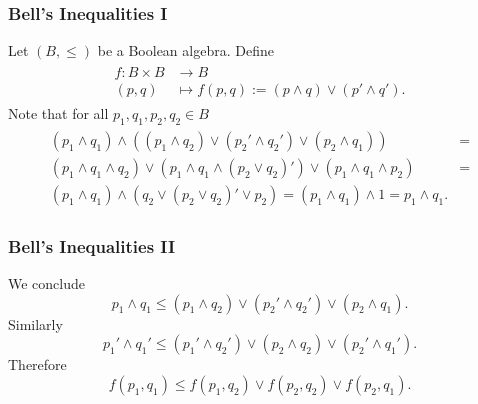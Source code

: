 \documentclass{beamer}
\begin{document}
\begin{frame}

	\frametitle{Bell's Inequalities I}
	
	Let $(B,\leq)$ be a Boolean algebra. Define
	\begin{align}
	\begin{split}
		f:B\times B&\rightarrow B\\
		(p,q)&\mapsto f(p,q):=(p\wedge q)\vee(p'\wedge q').
	\end{split}
	\end{align}
	Note that for all $p_1,q_1,p_2,q_2\in B$
	\begin{align}
	\begin{split}
		(p_1\wedge q_1)\wedge((p_1\wedge q_2)\vee(p_2'\wedge q_2')\vee(p_2\wedge q_1))&=\\
		(p_1\wedge q_1\wedge q_2)\vee(p_1\wedge q_1\wedge (p_2\vee q_2)')\vee(p_1\wedge q_1\wedge p_2)&=\\
		(p_1\wedge q_1)\wedge(q_2\vee(p_2\vee q_2)'\vee p_2)=(p_1\wedge q_1)\wedge 1=p_1\wedge q_1.&
	\end{split}
	\end{align}

\end{frame}
	
\begin{frame}
	
	\frametitle{Bell's Inequalities II}
	
	We conclude
	\begin{equation}
		p_1\wedge q_1\leq(p_1\wedge q_2)\vee(p_2'\wedge q_2')\vee(p_2\wedge q_1). 
	\end{equation}	
	Similarly
	\begin{equation}
		p_1'\wedge q_1'\leq(p_1'\wedge q_2')\vee(p_2\wedge q_2)\vee(p_2'\wedge q_1').
	\end{equation}
	Therefore
	\begin{equation}
		f(p_1,q_1)\leq f(p_1,q_2)\vee f(p_2,q_2)\vee f(p_2,q_1).
	\end{equation}	 
	
\end{frame}		
\end{document}
